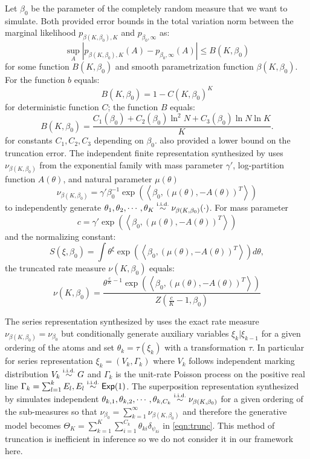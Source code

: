 \documentclass[letterpaper]{article}
\begin{document}
Let $\beta_0$ be the parameter of the completely random measure that we want to simulate. Both \cite{campbell19,nguyen20} provided error bounds in the total variation norm between the marginal likelihood $p_{\beta(K,\beta_0),K}$ and $p_{\beta_0,\infty}$ as:
\[
	\sup_A\left|p_{\beta(K,\beta_0),K}(A)-p_{\beta_0,\infty}(A)\right|\le B(K,\beta_0)
\]
for some function $B(K,\beta_0)$ and smooth parametrization function $\beta(K,\beta_0)$. For \cite{campbell19} the function $b$ equals:
\[
	B(K,\beta_0)=1-C(K,\beta_0)^K
\]
for deterministic function $C$; \cite{nguyen20} the function $B$ equals:
\[
	B(K,\beta_0)=\frac{C_1(\beta_0)+C_2(\beta_0)\ln^2N+C_3(\beta_0)\ln N\ln K}{K}.
\]
for constants $C_1,C_2,C_3$ depending on $\beta_0$. \cite{nguyen20} also provided a lower bound on the truncation error. The independent finite representation synthesized by \cite{nguyen20} uses $\nu_{\beta(K,\beta_0)}$ from the exponential family \cite{broderick18} with mass parameter $\gamma'$, log-partition function $A(\theta)$, and natural parameter $\mu(\theta)$ 
\[
	\nu_{\beta(K,\beta_0)}=\gamma'\beta_0^{-1}\exp\left(\left<\beta_0,\left(\mu(\theta),-A(\theta)\right)^T\right>\right)
\]
to independently generate $\theta_1,\theta_2,\cdots,\theta_K\distiid\nu_{\beta(K,\beta_0)}(\cdot)$.  For mass parameter 
\[
	c=\gamma'\exp\left(\left<\beta_0,\left(\mu(\theta),-A(\theta)\right)^T\right>\right)
\] and the normalizing constant:
\[
	S(\xi,\beta_0)=\int\theta^\xi\exp\left(\left<\beta_0,\left(\mu(\theta),-A(\theta)\right)^T\right>\right)d\theta,
\] 
the truncated rate measure $\nu(K,\beta_0)$ equals:
\[
	\nu(K,\beta_0)=\frac{\theta^{\frac{c}{K}-1}\exp\left(\left<\beta_0,\left(\mu(\theta),-A(\theta)\right)^T\right>\right)}{Z\left(\frac{c}{K}-1,\beta_0\right)}
\] 

The series representation synthesized by \cite{campbell19} uses the exact rate measure $\nu_{\beta(K,\beta_0)}=\nu_{\beta_0}$ but conditionally generate auxiliary variables $\xi_k|\xi_{k-1}$ for a given ordering of the atoms and set $\theta_k=\tau(\xi_k)$ with a transformation $\tau$. In particular for series representation $\xi_k=(V_k,\Gamma_k)$ where $V_k$ follows independent marking distribution $V_k\distiid G$ and $\Gamma_k$ is the unit-rate Poisson process on the positive real line $\Gamma_k=\sum_{l=1}^kE_l,E_l\distiid\distExp(1)$. The superposition representation synthesized by \cite{campbell19} simulates independent $\theta_{k,1},\theta_{k,2},\cdots,\theta_{k,C_k}\distiid\nu_{\beta(K,\beta_0)}$ for a given ordering of the sub-measures so  that $\nu_{\beta_0}=\sum_{k=1}^\infty\nu_{\beta(K,\beta_0)}$ and therefore the generative model becomes $\Theta_K=\sum_{k=1}^K\sum_{i=1}^{C_k}\theta_{ki}\delta_{\psi_{ki}}$ in \ref{eqn:trunc}. This method of truncation is inefficient in inference \cite{zhu20,nguyen20} so we do not consider it in our framework here. 
\end{document}
